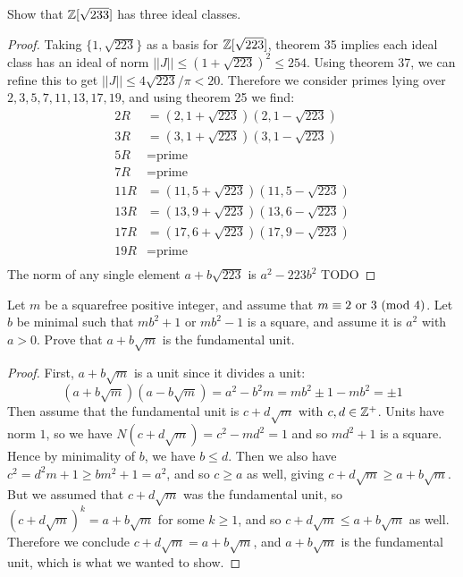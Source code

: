 \documentclass[11pt]{article}
\begin{document}
Show that $\mathbb{Z}[\sqrt{233}]$ has three ideal classes.
\begin{proof}
  Taking $\{1,\sqrt{223}\}$ as a basis for $\mathbb{Z}[\sqrt{223}]$, theorem 35 implies each ideal class has an ideal of norm $||J|| \le (1 + \sqrt{223})^2 \le 254$. Using theorem 37, we can refine this to get $||J|| \le 4\sqrt{223}/\pi < 20$. Therefore we consider primes lying over $2,3,5,7,11,13,17,19$, and using theorem 25 we find:
  \begin{align*}
    2R &= (2, 1+\sqrt{223})(2, 1-\sqrt{223}) \\
    3R &= (3, 1+\sqrt{223})(3, 1-\sqrt{223}) \\
    5R &= \text{prime} \\
    7R &= \text{prime} \\
    11R &= (11, 5+\sqrt{223})(11, 5-\sqrt{223}) \\
    13R &= (13, 9+\sqrt{223})(13, 6-\sqrt{223}) \\
    17R &= (17, 6+\sqrt{223})(17, 9-\sqrt{223}) \\
    19R &= \text{prime} \\
  \end{align*}
  The norm of any single element $a + b\sqrt{223}$ is $a^2 - 223b^2$ TODO
\end{proof}


Let $m$ be a squarefree positive integer, and assume that $m \equiv 2 \text{ or } 3\ (\text{mod}\ 4)$.
Let $b$ be minimal such that $mb^2+1$ or $mb^2-1$ is a square, and assume it is $a^2$ with $a > 0$.
Prove that $a + b\sqrt{m}$ is the fundamental unit.

\begin{proof}
  First, $a+b\sqrt{m}$ is a unit since it divides a unit:
  \begin{equation*}
    (a+b\sqrt{m})(a-b\sqrt{m})
    = a^2 - b^2m = mb^2 \pm 1 - mb^2 = \pm 1
  \end{equation*}
  Then assume that the fundamental unit is $c + d\sqrt{m}$ with $c,d \in \mathbb{Z}^+$.
  Units have norm $1$, so we have $N(c+d\sqrt{m}) = c^2 - md^2 = 1$ and so $md^2 + 1$ is a square.
  Hence by minimality of $b$, we have $b \le d$.
  Then we also have $c^2 = d^2m + 1 \ge bm^2 + 1 = a^2$, and so $c \ge a$ as well, giving $c + d\sqrt{m} \ge a + b\sqrt{m}$.
  But we assumed that $c + d\sqrt{m}$ was the fundamental unit, so $(c+d\sqrt{m})^k = a + b\sqrt{m}$ for some $k \ge 1$, and so $c + d\sqrt{m} \le a + b\sqrt{m}$ as well.
  Therefore we conclude $c + d\sqrt{m} = a + b\sqrt{m}$, and $a + b\sqrt{m}$ is the fundamental unit, which is what we wanted to show.
\end{proof}
\end{document}
